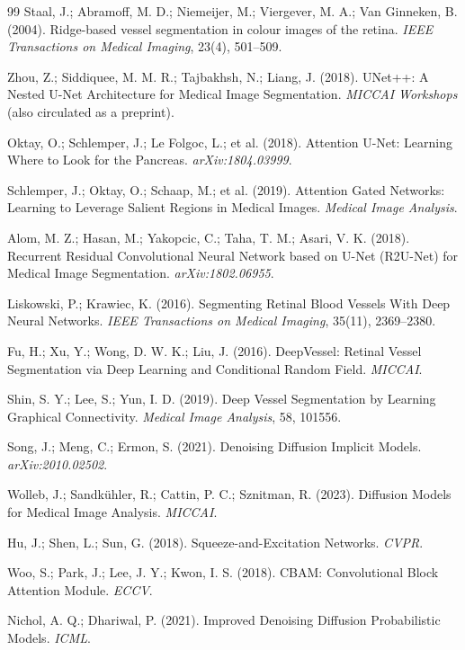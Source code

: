 \documentclass[journal,article,submit,pdftex,moreauthors]{Definitions/mdpi}
\begin{document}
\begin{thebibliography}{99}
Staal, J.; Abramoff, M. D.; Niemeijer, M.; Viergever, M. A.; Van Ginneken, B. (2004).
Ridge-based vessel segmentation in colour images of the retina.
\textit{IEEE Transactions on Medical Imaging}, 23(4), 501--509.

Zhou, Z.; Siddiquee, M. M. R.; Tajbakhsh, N.; Liang, J. (2018).
UNet++: A Nested U-Net Architecture for Medical Image Segmentation.
\textit{MICCAI Workshops} (also circulated as a preprint).

Oktay, O.; Schlemper, J.; Le Folgoc, L.; et al. (2018).
Attention U-Net: Learning Where to Look for the Pancreas.
\textit{arXiv:1804.03999}.

Schlemper, J.; Oktay, O.; Schaap, M.; et al. (2019).
Attention Gated Networks: Learning to Leverage Salient Regions in Medical Images.
\textit{Medical Image Analysis}.


Alom, M. Z.; Hasan, M.; Yakopcic, C.; Taha, T. M.; Asari, V. K. (2018).
Recurrent Residual Convolutional Neural Network based on U-Net (R2U-Net) for Medical Image Segmentation.
\textit{arXiv:1802.06955}.

Liskowski, P.; Krawiec, K. (2016).
Segmenting Retinal Blood Vessels With Deep Neural Networks.
\textit{IEEE Transactions on Medical Imaging}, 35(11), 2369--2380.


Fu, H.; Xu, Y.; Wong, D. W. K.; Liu, J. (2016).
DeepVessel: Retinal Vessel Segmentation via Deep Learning and Conditional Random Field.
\textit{MICCAI}.

Shin, S. Y.; Lee, S.; Yun, I. D. (2019).
Deep Vessel Segmentation by Learning Graphical Connectivity.
\textit{Medical Image Analysis}, 58, 101556.

Song, J.; Meng, C.; Ermon, S. (2021).
Denoising Diffusion Implicit Models.
\textit{arXiv:2010.02502}.

Wolleb, J.; Sandk\"uhler, R.; Cattin, P. C.; Sznitman, R. (2023).
Diffusion Models for Medical Image Analysis.
\textit{MICCAI}.


Hu, J.; Shen, L.; Sun, G. (2018).
Squeeze-and-Excitation Networks.
\textit{CVPR}.

Woo, S.; Park, J.; Lee, J. Y.; Kwon, I. S. (2018).
CBAM: Convolutional Block Attention Module.
\textit{ECCV}.

Nichol, A. Q.; Dhariwal, P. (2021).
Improved Denoising Diffusion Probabilistic Models.
\textit{ICML}.



\end{thebibliography}
\end{document}
